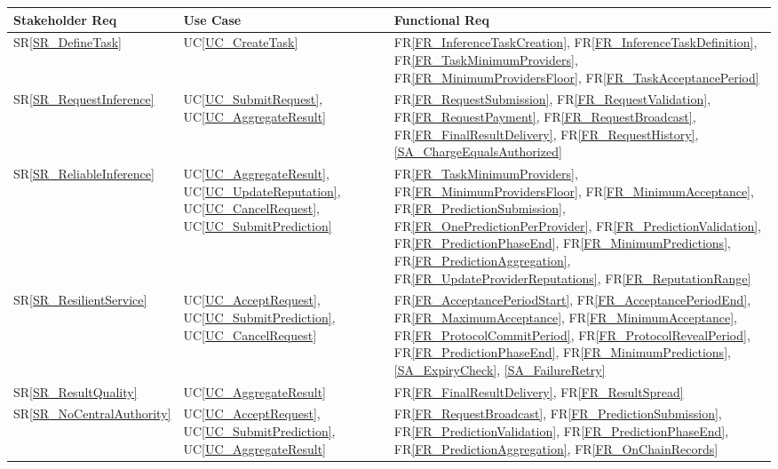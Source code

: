 \documentclass[12pt]{article}
\newcommand{\srref}[1]{SR\ref{#1}}
\newcommand{\ucref}[1]{UC\ref{#1}}
\newcommand{\rref}[1]{FR\ref{#1}}
\begin{document}
\begin{longtable}{p{} p{} p{}}

\toprule
Stakeholder Req & Use Case & Functional Req \\
\midrule
\srref{SR_DefineTask} & \ucref{UC_CreateTask}
  & \rref{FR_InferenceTaskCreation}, \rref{FR_InferenceTaskDefinition}, \rref{FR_TaskMinimumProviders}, \rref{FR_MinimumProvidersFloor}, \rref{FR_TaskAcceptancePeriod} \\[0.5em]

\srref{SR_RequestInference} & \ucref{UC_SubmitRequest}, \ucref{UC_AggregateResult}
  & \rref{FR_RequestSubmission}, \rref{FR_RequestValidation}, \rref{FR_RequestPayment}, \rref{FR_RequestBroadcast}, \rref{FR_FinalResultDelivery}, \rref{FR_RequestHistory}, \ref{SA_ChargeEqualsAuthorized} \\[0.5em]

\srref{SR_ReliableInference} & \ucref{UC_AggregateResult}, \ucref{UC_UpdateReputation}, \ucref{UC_CancelRequest}, \ucref{UC_SubmitPrediction}
  & \rref{FR_TaskMinimumProviders}, \rref{FR_MinimumProvidersFloor}, \rref{FR_MinimumAcceptance}, \rref{FR_PredictionSubmission}, \rref{FR_OnePredictionPerProvider}, \rref{FR_PredictionValidation}, \rref{FR_PredictionPhaseEnd}, \rref{FR_MinimumPredictions}, \rref{FR_PredictionAggregation}, \rref{FR_UpdateProviderReputations}, \rref{FR_ReputationRange} \\[0.5em]

\srref{SR_ResilientService} & \ucref{UC_AcceptRequest}, \ucref{UC_SubmitPrediction}, \ucref{UC_CancelRequest}
  & \rref{FR_AcceptancePeriodStart}, \rref{FR_AcceptancePeriodEnd}, \rref{FR_MaximumAcceptance}, \rref{FR_MinimumAcceptance}, \rref{FR_ProtocolCommitPeriod}, \rref{FR_ProtocolRevealPeriod}, \rref{FR_PredictionPhaseEnd}, \rref{FR_MinimumPredictions}, \ref{SA_ExpiryCheck}, \ref{SA_FailureRetry} \\[0.5em]

\srref{SR_ResultQuality} & \ucref{UC_AggregateResult}
  & \rref{FR_FinalResultDelivery}, \rref{FR_ResultSpread} \\[0.5em]

\srref{SR_NoCentralAuthority} & \ucref{UC_AcceptRequest}, \ucref{UC_SubmitPrediction}, \ucref{UC_AggregateResult}
  & \rref{FR_RequestBroadcast}, \rref{FR_PredictionSubmission}, \rref{FR_PredictionValidation}, \rref{FR_PredictionPhaseEnd}, \rref{FR_PredictionAggregation}, \rref{FR_OnChainRecords} \\[0.5em]


\end{longtable}
\end{document}
